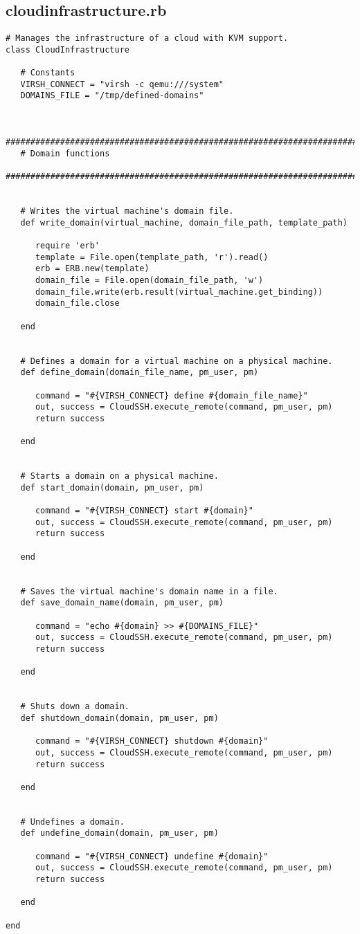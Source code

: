 \subsection{cloudinfrastructure.rb}


\begin{lstlisting}
# Manages the infrastructure of a cloud with KVM support.
class CloudInfrastructure

   # Constants
   VIRSH_CONNECT = "virsh -c qemu:///system"
   DOMAINS_FILE = "/tmp/defined-domains"


   #############################################################################
   # Domain functions
   #############################################################################


   # Writes the virtual machine's domain file.
   def write_domain(virtual_machine, domain_file_path, template_path)

      require 'erb'
      template = File.open(template_path, 'r').read()
      erb = ERB.new(template)
      domain_file = File.open(domain_file_path, 'w')
      domain_file.write(erb.result(virtual_machine.get_binding))
      domain_file.close

   end


   # Defines a domain for a virtual machine on a physical machine.
   def define_domain(domain_file_name, pm_user, pm)

      command = "#{VIRSH_CONNECT} define #{domain_file_name}"
      out, success = CloudSSH.execute_remote(command, pm_user, pm)
      return success
      
   end


   # Starts a domain on a physical machine.
   def start_domain(domain, pm_user, pm)

      command = "#{VIRSH_CONNECT} start #{domain}"
      out, success = CloudSSH.execute_remote(command, pm_user, pm)
      return success
      
   end


   # Saves the virtual machine's domain name in a file.
   def save_domain_name(domain, pm_user, pm)

      command = "echo #{domain} >> #{DOMAINS_FILE}"
      out, success = CloudSSH.execute_remote(command, pm_user, pm)
      return success

   end


   # Shuts down a domain.
   def shutdown_domain(domain, pm_user, pm)

      command = "#{VIRSH_CONNECT} shutdown #{domain}"
      out, success = CloudSSH.execute_remote(command, pm_user, pm)
      return success

   end


   # Undefines a domain.
   def undefine_domain(domain, pm_user, pm)

      command = "#{VIRSH_CONNECT} undefine #{domain}"
      out, success = CloudSSH.execute_remote(command, pm_user, pm)
      return success

   end

end
\end{lstlisting}


